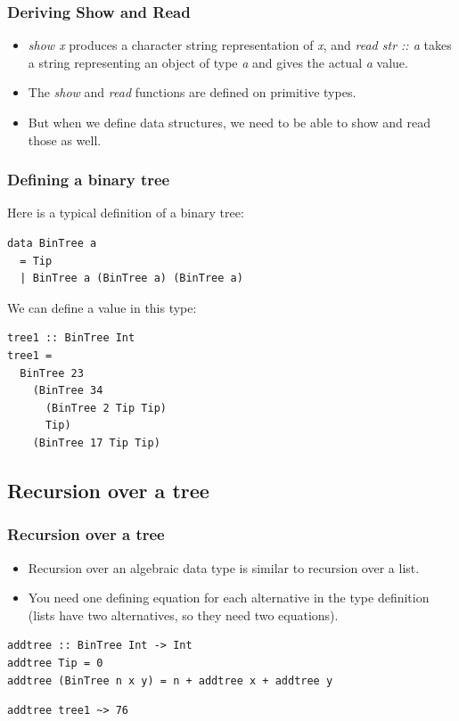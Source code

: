\documentclass{beamer}
\begin{document}
\begin{frame}[fragile]
\frametitle{Deriving Show and Read}

\begin{itemize}
\item \emph{show x} produces a character string representation
  of \emph{x}, and \emph{read str :: a} takes a string representing an object
  of type \emph{a} and gives the actual \emph{a} value.
\item The \emph{show} and \emph{read} functions are defined on primitive
  types.
\item But when we define data structures, we need to be able to
  show and read those as well.
\end{itemize}

\end{frame}


\begin{frame}[fragile]
\frametitle{Defining a binary tree}

Here is a typical definition of a binary tree:

\begin{verbatim}
data BinTree a
  = Tip
  | BinTree a (BinTree a) (BinTree a)
\end{verbatim}

We can define a value in this type:

\begin{verbatim}
tree1 :: BinTree Int
tree1 =
  BinTree 23
    (BinTree 34
      (BinTree 2 Tip Tip)
      Tip)
    (BinTree 17 Tip Tip)
\end{verbatim}

\end{frame}

\subsection{Recursion over a tree}
\begin{frame}[fragile]
\frametitle{Recursion over a tree}

\begin{itemize}
\item Recursion over an algebraic data type is similar to recursion
  over a list.
\item You need one defining equation for each alternative in the
  type definition (lists have two alternatives, so they need two
  equations).
\end{itemize}

\begin{verbatim}
addtree :: BinTree Int -> Int
addtree Tip = 0
addtree (BinTree n x y) = n + addtree x + addtree y
\end{verbatim}

\begin{verbatim}
addtree tree1 ~> 76
\end{verbatim}

\end{frame}
\end{document}

